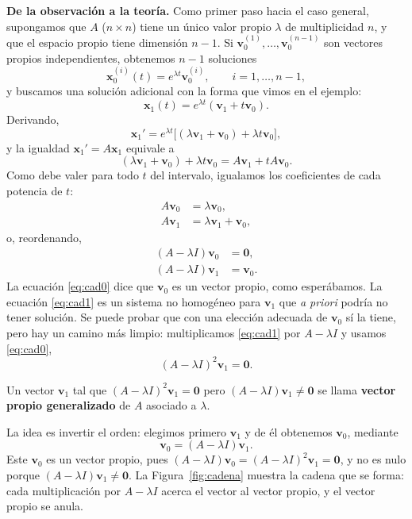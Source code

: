 \textbf{De la observaci\'on a la teor\'ia.} Como primer paso hacia el caso general, supongamos que $A$ ($n\times n$) tiene un \'unico valor propio $\lambda$ de multiplicidad $n$, y que el espacio propio tiene dimensi\'on $n-1$. Si $\mathbf{v}_0^{(1)}, \dots, \mathbf{v}_0^{(n-1)}$ son vectores propios independientes, obtenemos $n-1$ soluciones
\[
\mathbf{x}_0^{(i)}(t) = e^{\lambda t}\mathbf{v}_0^{(i)}, \qquad i = 1, \dots, n - 1,
\]
y buscamos una soluci\'on adicional con la forma que vimos en el ejemplo:
\[
\mathbf{x}_1(t) = e^{\lambda t}(\mathbf{v}_1 + t\mathbf{v}_0).
\]
Derivando,
\[
\mathbf{x}_1' = e^{\lambda t}\big[(\lambda\mathbf{v}_1 + \mathbf{v}_0) + \lambda t\mathbf{v}_0\big],
\]
y la igualdad $\mathbf{x}_1' = A\mathbf{x}_1$ equivale a
\[
(\lambda\mathbf{v}_1 + \mathbf{v}_0) + \lambda t\mathbf{v}_0 = A\mathbf{v}_1 + t A\mathbf{v}_0.
\]
Como debe valer para todo $t$ del intervalo, igualamos los coeficientes de cada potencia de $t$:
\begin{align*}
A\mathbf{v}_0 &= \lambda\mathbf{v}_0, \\
A\mathbf{v}_1 &= \lambda\mathbf{v}_1 + \mathbf{v}_0,
\end{align*}
o, reordenando,
\begin{align}
(A - \lambda I)\mathbf{v}_0 &= \mathbf{0}, \label{eq:cad0}\\
(A - \lambda I)\mathbf{v}_1 &= \mathbf{v}_0. \label{eq:cad1}
\end{align}
La ecuaci\'on \eqref{eq:cad0} dice que $\mathbf{v}_0$ es un vector propio, como esper\'abamos. La ecuaci\'on \eqref{eq:cad1} es un sistema no homog\'eneo para $\mathbf v_1$ que \emph{a priori} podr\'ia no tener soluci\'on. Se puede probar que con una elecci\'on adecuada de $\mathbf v_0$ s\'i la tiene, pero hay un camino m\'as limpio: multiplicamos \eqref{eq:cad1} por $A-\lambda I$ y usamos \eqref{eq:cad0},
\begin{equation}\label{eq:cad2}
(A - \lambda I)^2\mathbf{v}_1 = \mathbf{0}.
\end{equation}

\begin{definition}
Un vector $\mathbf v_1$ tal que $(A-\lambda I)^2\mathbf v_1=\mathbf 0$ pero $(A-\lambda I)\mathbf v_1\neq\mathbf 0$ se llama \textbf{vector propio generalizado} de $A$ asociado a $\lambda$.
\end{definition}

La idea es invertir el orden: elegimos primero $\mathbf v_1$ y de \'el obtenemos $\mathbf v_0$, mediante
\[
\mathbf{v}_0 = (A - \lambda I)\mathbf{v}_1.
\]
Este $\mathbf v_0$ es un vector propio, pues $(A - \lambda I)\mathbf{v}_0 = (A - \lambda I)^2\mathbf{v}_1 = \mathbf{0}$, y no es nulo porque $(A-\lambda I)\mathbf v_1\neq\mathbf 0$. La Figura~\ref{fig:cadena} muestra la cadena que se forma: cada multiplicaci\'on por $A-\lambda I$ acerca el vector al vector propio, y el vector propio se anula.

